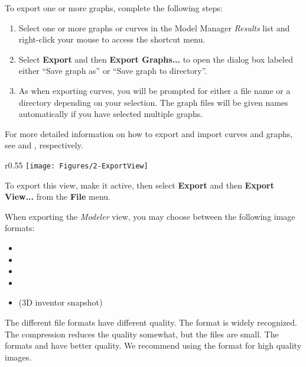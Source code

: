 To export one or more graphs, complete the following steps:

\begin{enumerate}
\item Select one or more graphs or curves in the Model Manager {\sl Results}
  list and right-click your mouse to access the shortcut menu.
\item Select \textbf{Export} and then \textbf{Export Graphs...} to open the
  dialog box labeled either ``Save graph as'' or ``Save graph to directory''.
\item As when exporting curves, you will be prompted for either a file name
  or a directory depending on your selection. The graph files will be given
  names automatically if you have selected multiple graphs.
\end{enumerate}

For more detailed information on how to export and import curves and
graphs, see 
and ,
respectively.



\begin{wrapfigure}[12]{r}{0.55\textwidth} \vskip-5mm
  \texttt{[image: Figures/2-ExportView]}
\end {wrapfigure}

To export this view, make it \newline
active, then select \textbf{Export} and \newline
then \textbf{Export View...} from the \newline \textbf{File} menu.

When exporting the {\sl Modeler} view, you may choose between the following
image formats:

\begin{itemize}
\item{}
\item{}
\item{}
\item{}
\item{} \small(3D inventor snapshot)
\end{itemize}

The different file formats have different quality.
The format  is widely recognized.
The compression reduces the quality somewhat, but the files are small.
The formats  and  have better quality.
We recommend using the  format for high quality images.

